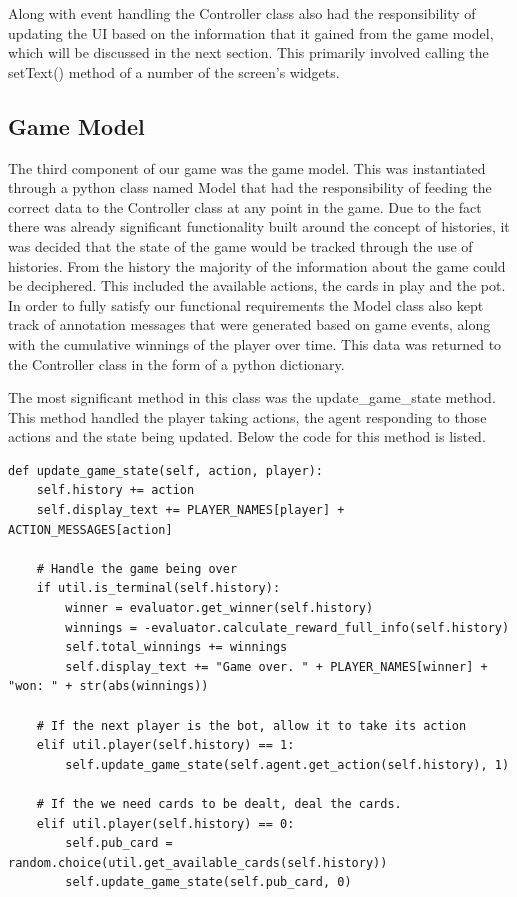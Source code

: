 Along with event handling the Controller class also had the responsibility of updating the
UI based on the information that it gained from the game model, which will be discussed in the next section.
This primarily involved calling the setText() method of a number of the screen's widgets.

\subsection{Game Model}\label{subsec:gameModel}
The third component of our game was the game model.
This was instantiated through a python class named Model that had the responsibility of feeding
the correct data to the Controller class at any point in the game.
Due to the fact there was already significant functionality built around the concept of histories,
it was decided that the state of the game would be tracked through the use of histories.
From the history the majority of the information about the game could be deciphered.
This included the available actions, the cards in play and the pot.
In order to fully satisfy our functional requirements the Model class also kept track of annotation messages
that were generated based on game events, along with the cumulative winnings of the player over time.
This data was returned to the Controller class in the
form of a python dictionary.

The most significant method in this class was the update\_game\_state method.
This method handled the player taking actions, the agent responding to those actions and the state being
updated.
Below the code for this method is listed.

\begin{lstlisting}[style=Python]
def update_game_state(self, action, player):
    self.history += action
    self.display_text += PLAYER_NAMES[player] + ACTION_MESSAGES[action]

    # Handle the game being over
    if util.is_terminal(self.history):
        winner = evaluator.get_winner(self.history)
        winnings = -evaluator.calculate_reward_full_info(self.history)
        self.total_winnings += winnings
        self.display_text += "Game over. " + PLAYER_NAMES[winner] + "won: " + str(abs(winnings))

    # If the next player is the bot, allow it to take its action
    elif util.player(self.history) == 1:
        self.update_game_state(self.agent.get_action(self.history), 1)

    # If the we need cards to be dealt, deal the cards.
    elif util.player(self.history) == 0:
        self.pub_card = random.choice(util.get_available_cards(self.history))
        self.update_game_state(self.pub_card, 0)
\end{lstlisting}

